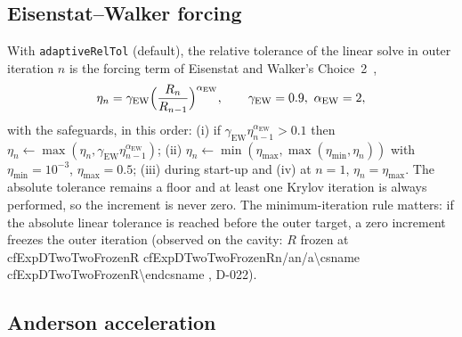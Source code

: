 \documentclass[11pt,a4paper]{article}
\makeatletter
\newcommand{\cfpendingmark}{\fbox{\scriptsize pending}}
\def\cf@na{n/a}
\newcommand{\cfsci}[1]{%
  \ifcsname cf#1\endcsname
    \edef\cf@tmp{\csname cf#1\endcsname}%
    \ifx\cf@tmp\cf@na n/a\else\expandafter\num\expandafter{\cf@tmp}\fi
  \else\cfpendingmark\fi}
\newcommand{\code}[1]{\texttt{#1}}
\makeatother
\begin{document}
\subsection{Eisenstat--Walker forcing}\label{sec:ew}

With \code{adaptiveRelTol} (default), the relative tolerance of the linear
solve in outer iteration $n$ is the forcing term of Eisenstat and Walker's
Choice~2~\cite{EisenstatWalker1996},
\begin{equation}
  \eta_n = \gamma_{\mathrm{EW}}\Bigl(\frac{R_n}{R_{n-1}}\Bigr)^{\alpha_{\mathrm{EW}}},
  \qquad \gamma_{\mathrm{EW}}=0.9,\ \alpha_{\mathrm{EW}}=2,
\end{equation}
with the safeguards, in this order: (i) if
$\gamma_{\mathrm{EW}}\eta_{n-1}^{\alpha_{\mathrm{EW}}}>0.1$ then
$\eta_n\leftarrow\max(\eta_n,\gamma_{\mathrm{EW}}\eta_{n-1}^{\alpha_{\mathrm{EW}}})$;
(ii) $\eta_n\leftarrow\min(\eta_{\max},\max(\eta_{\min},\eta_n))$
with $\eta_{\min}=10^{-3}$, $\eta_{\max}=0.5$; (iii) during start-up and
(iv) at $n=1$, $\eta_n=\eta_{\max}$. The absolute tolerance remains a floor
and at least one Krylov iteration is always performed, so the increment is
never zero. The minimum-iteration rule matters: if the absolute linear
tolerance is reached before the outer target, a zero increment freezes the
outer iteration (observed on the cavity: $R$ frozen at
\cfsci{ExpDTwoTwoFrozenR}, D-022).

\subsection{Anderson acceleration}\label{sec:anderson}
\end{document}
